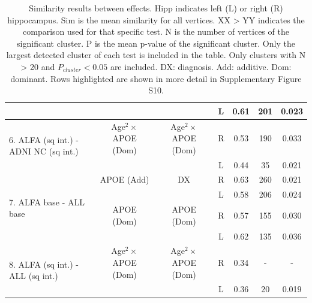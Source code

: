 \begin{table}[htbp]
{\begin{tabular}{@{}p{7cm}cccccc}
                              & \cellcolor{Gray}   & \cellcolor{Gray} &  \cellcolor{Gray} L   & \cellcolor{Gray} 0.61 & \cellcolor{Gray} 201 & \cellcolor{Gray} 0.023 \\ \midrule
\multirow{2}{*}{6. ALFA (sq int.) - ADNI NC (sq int.)} & Age$^2\times$APOE (Dom) & Age$^2\times$APOE (Dom)  & R    & 0.53 & 190 & 0.033 \\
                               &     &          & L    & 0.44 & 35 & 0.021 \\ \midrule
\multirow{4}{*}{7. ALFA base - ALL base}  &  APOE (Add)      & DX   & R   & 0.63 & 260 & 0.021 \\ 
                              &      &          & L    & 0.58 & 206 & 0.024 \\
                              &   APOE (Dom)      & APOE (Dom)   & R   & 0.57 & 155 & 0.030 \\ 
                              &       &          & L    & 0.62 & 135 & 0.036 \\ \midrule
\multirow{2}{*}{8. ALFA (sq int.) - ALL (sq int.)}     & Age$^2\times$APOE (Dom) & Age$^2\times$APOE (Dom)  & R  & 0.34 & - & - \\
                               &          &          & L    & 0.36 & 20 & 0.019 \\ \bottomrule 
\end{tabular}}
\caption{Similarity results between effects. Hipp indicates left (L) or right (R) hippocampus. Sim is the mean similarity for all vertices. XX > YY indicates the comparison used for that specific test. N is the number of vertices of the significant cluster. P is the mean p-value of the significant cluster. Only the largest detected cluster of each test is included in the table. Only clusters with N > 20 and $P_{cluster} < 0.05$ are included. DX: diagnosis. Add: additive. Dom: dominant. Rows highlighted are shown in more detail in Supplementary Figure S10.}\label{table:sim}
\end{table}

